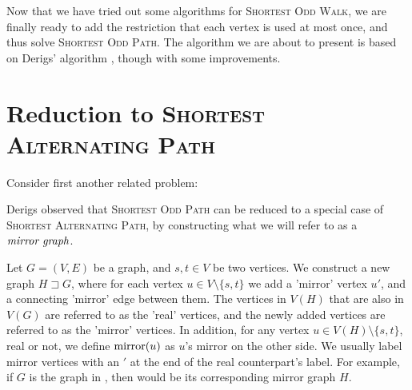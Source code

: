 Now that we have tried out some algorithms for \textsc{Shortest Odd Walk}, we are finally ready to add the restriction that each vertex is used at most once, and thus solve \textsc{Shortest Odd Path}. The algorithm we are about to present is based on Derigs' algorithm \cite{source:derigs_shortest_odd_path}, though with some improvements.

\section{Reduction to \textsc{Shortest Alternating Path}}
\label{subsection:reduction}
Consider first another related problem:

\noindent{}

Derigs observed that \textsc{Shortest Odd Path} can be reduced to a special case of \textsc{Shortest Alternating Path}, by constructing what we will refer to as a $\emph{mirror graph}$. 

\begin{definition}
    \label{def:mirror-graph}
    Let $G = (V, E)$ be a graph, and $s,t \in V$ be two vertices.
    We construct a new graph $H \sqsupset G$, where for each vertex $u \in V \setminus \{s,t\}$ we add a 'mirror' vertex $u'$, and a connecting 'mirror' edge between them. 
    The vertices in $V(H)$ that are also in $V(G)$ are referred to as the 'real' vertices, and the newly added vertices are referred to as the 'mirror' vertices. In addition, for any vertex $u \in V(H) \setminus \{s,t\}$, real or not, we define $\operatorname{mirror}(u)$ as $u$'s mirror on the other side. We usually label mirror vertices with an $'$ at the end of the real counterpart's label.
    For example, if $G$ is the graph in , then  would be its corresponding mirror graph $H$.
\end{definition}

